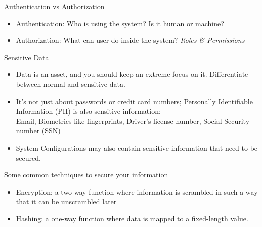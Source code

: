 \documentclass{beamer}
\begin{document}
\begin{frame}[t]{Authentication vs Authorization}
  \begin{itemize}
  	\small
    \item Authentication: Who is using the system? Is it human or machine?
    \item Authorization: What can user do inside the system? \textit{Roles \& Permissions}
  \end{itemize}
  
  \begin{block}{Sensitive Data}
    \scriptsize
  	\begin{itemize}
		\item Data is an asset, and you should keep an extreme focus on it. Differentiate between normal and sensitive data. 
		\item It's not just about passwords or credit card numbers; Personally Identifiable Information (PII) is also sensitive information: \\ 
  			Email, Biometrics like fingerprints, Driver's license number, Social Security number (SSN)
  	
  		\item System Configurations may also contain sensitive information that need to be secured.
  	\end{itemize}
  \end{block}
  
  \small Some common techniques to secure your information
  \scriptsize
  \begin{itemize}
    \item Encryption: a two-way function where information is scrambled in such a way that it can be unscrambled later
    \item Hashing: a one-way function where data is mapped to a fixed-length value.
  \end{itemize}
  
  
\end{frame}
\end{document}
